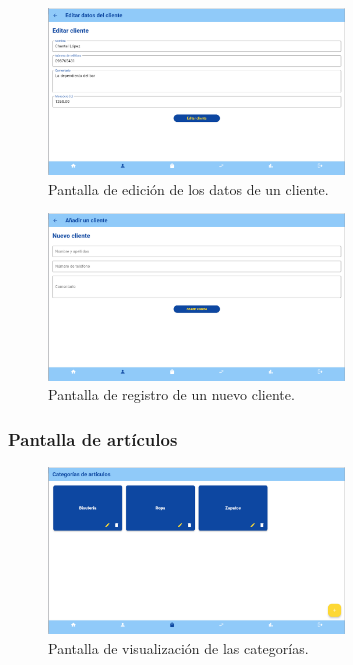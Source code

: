 \begin{figure}[H]
	\centering
	\includegraphics[width=0.7\textwidth]{imagenes/TerceraIteracion/clientEdit.png}
	\caption{Pantalla de edición de los datos de un cliente.}
\end{figure}

\begin{figure}[H]
	\centering
	\includegraphics[width=0.7\textwidth]{imagenes/TerceraIteracion/newClient.png}
	\caption{Pantalla de registro de un nuevo cliente.}
\end{figure}

\subsubsection{Pantalla de artículos}

\begin{figure}[H]
	\centering
	\includegraphics[width=0.7\textwidth]{imagenes/TerceraIteracion/categoryView.png}
	\caption{Pantalla de visualización de las categorías.}
\end{figure}

